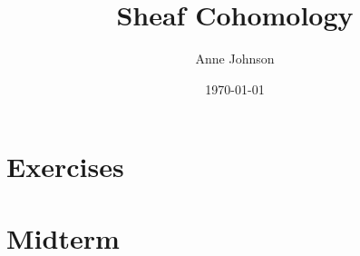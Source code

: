 \documentclass[11pt]{report}
\title{Sheaf Cohomology}
\author{Anne Johnson}
\date{\today}
\theoremstyle{definition}
\begin{document}



%
%
%
%
%
%
%
%
\chapter*{Exercises}





\chapter*{Midterm}

%

%	
\end{document}
